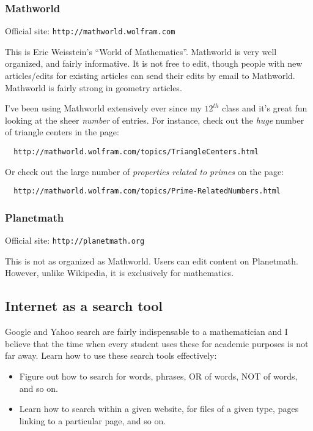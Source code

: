 \documentclass[a4paper]{amsart}
\begin{document}
\subsubsection{Mathworld}

Official site: {\tt http://mathworld.wolfram.com}

This is Eric Weisstein's ``World of Mathematics''. Mathworld is very well organized, and fairly informative. It is not free to edit,
though people with new articles/edits for existing articles can send their edits by email to Mathworld. Mathworld
is fairly strong in geometry articles.

I've been using Mathworld extensively ever since my $12^{th}$ class and it's great fun looking at the sheer {\em number} of entries.
For instance, check out the {\em huge} number of triangle centers in the page:

\begin{verbatim}
  http://mathworld.wolfram.com/topics/TriangleCenters.html
\end{verbatim}

Or check out the large number of {\em properties related to primes} on the page:

\begin{verbatim}
  http://mathworld.wolfram.com/topics/Prime-RelatedNumbers.html
\end{verbatim}
\subsubsection{Planetmath}

Official site: {\tt http://planetmath.org}

This is not as organized as Mathworld. Users can edit content on Planetmath. However, unlike Wikipedia, it is exclusively for
mathematics.

\subsection{Internet as a search tool}

Google and Yahoo search are fairly indispensable to a mathematician and I believe that the time when every student uses these
for academic purposes is not far away. Learn how to use these search tools effectively:

\begin{itemize}

\item Figure out how to search for words, phrases, OR of words, NOT of words, and so on.

\item Learn how to search within a given website, for files of a given type, pages linking to a particular page, and so on.

\end{itemize}
\end{document}
